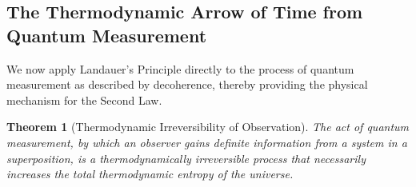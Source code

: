 \documentclass[11pt, letterpaper]{report}
\theoremstyle{plain} %
\newtheorem{theorem}{Theorem}[chapter]
\theoremstyle{definition} %
\theoremstyle{remark} %
\begin{document}
\subsection{The Thermodynamic Arrow of Time from Quantum Measurement}
We now apply Landauer's Principle directly to the process of quantum measurement as described by decoherence, thereby providing the physical mechanism for the Second Law.

\begin{theorem}[Thermodynamic Irreversibility of Observation]
\label{thm:thermo_irreversibility}
The act of quantum measurement, by which an observer gains definite information from a system in a superposition, is a thermodynamically irreversible process that necessarily increases the total thermodynamic entropy of the universe.
\end{theorem}
\end{document}

